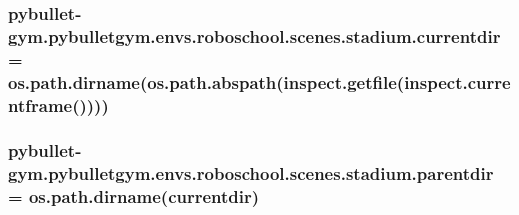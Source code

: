 \subsubsection[{\texorpdfstring{currentdir}{currentdir}}]{\setlength{\rightskip}{0pt plus 5cm}pybullet-\/gym.\+pybulletgym.\+envs.\+roboschool.\+scenes.\+stadium.\+currentdir = os.\+path.\+dirname(os.\+path.\+abspath(inspect.\+getfile(inspect.\+currentframe())))}\hypertarget{namespacepybullet-gym_1_1pybulletgym_1_1envs_1_1roboschool_1_1scenes_1_1stadium_acc26a7ae6c65fd583d68323e6a322b9b}{}\label{namespacepybullet-gym_1_1pybulletgym_1_1envs_1_1roboschool_1_1scenes_1_1stadium_acc26a7ae6c65fd583d68323e6a322b9b}
\subsubsection[{\texorpdfstring{parentdir}{parentdir}}]{\setlength{\rightskip}{0pt plus 5cm}pybullet-\/gym.\+pybulletgym.\+envs.\+roboschool.\+scenes.\+stadium.\+parentdir = os.\+path.\+dirname({\bf currentdir})}\hypertarget{namespacepybullet-gym_1_1pybulletgym_1_1envs_1_1roboschool_1_1scenes_1_1stadium_aa678ae0501de3715ff91c05f577d08e0}{}\label{namespacepybullet-gym_1_1pybulletgym_1_1envs_1_1roboschool_1_1scenes_1_1stadium_aa678ae0501de3715ff91c05f577d08e0}

